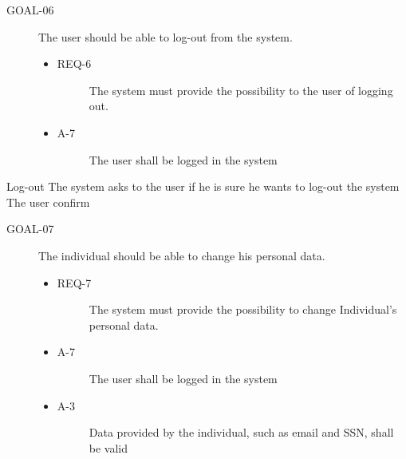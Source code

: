 \documentclass[a4paper]{article}
\newcommand{\requirement}{\ding{229}}%
\begin{document}
        \begin{description}
        	\item[GOAL-06] The user should be able to log-out from the system. 
            	\begin{itemize}
            	    \item[\requirement]
                	\begin{description}
                	\item[REQ-6] The system must provide the possibility to the user of logging out. 
                	\end{description}
                	\item
                	\begin{description}
                	\item[A-7] The user shall be logged in the system
                	\end{description}
                	\end{itemize}
        \end{description}
              
       \begin{usecase}{Log-out}
              {The system asks to the user if he is sure he wants to log-out the system}
              {The user confirm}
        \end{usecase}
       
       \begin{description}
        	\item[GOAL-07] The individual should be able to change his personal data. 
            	\begin{itemize}
            	    \item[\requirement]
                	\begin{description}
                	\item[REQ-7] The system must provide the possibility to change Individual's personal data. 
                	\end{description}
                	\item
                	\begin{description}
                	\item[A-7] The user shall be logged in the system
                	\end{description}
                	\item
                	\begin{description}
                	\item[A-3] Data provided by the individual, such as email and SSN, shall be valid
                	\end{description}
                	\end{itemize}
        \end{description}
      
\end{document}

